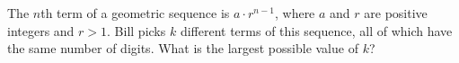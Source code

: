 The $n$th term of a geometric sequence is $a\cdot r^{n-1}$, where $a$ and $r$ are positive integers and $r>1$. Bill picks $k$ different terms of this sequence, all of which have the same number of digits. What is the largest possible value of $k$?
